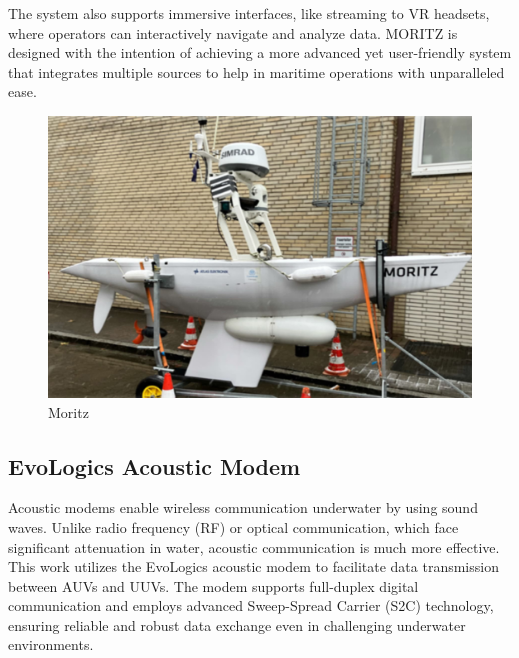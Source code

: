 \documentclass[]{nsm-thesis}
\begin{document}
The system also supports immersive interfaces, like streaming to VR headsets, where operators can interactively navigate and analyze data. MORITZ is designed with the intention of achieving a more advanced yet user-friendly system that integrates multiple sources to help in maritime operations with unparalleled ease.
\begin{figure}[h]
\graphicspath{{/image/}} %
\centering
\includegraphics[scale=0.4]{image/Moritz.png} %
\caption{Moritz}
\label{fig:mesh1} %
\end{figure}
\subsection{EvoLogics Acoustic Modem}
Acoustic modems enable wireless communication underwater by using sound waves. Unlike radio frequency (RF) or optical communication, which face significant attenuation in water, acoustic communication is much more effective. This work utilizes the EvoLogics acoustic modem to facilitate data transmission between AUVs and UUVs. The modem supports full-duplex digital communication and employs advanced Sweep-Spread Carrier (S2C) technology\cite{S2C}, ensuring reliable and robust data exchange even in challenging underwater environments.
\end{document}
